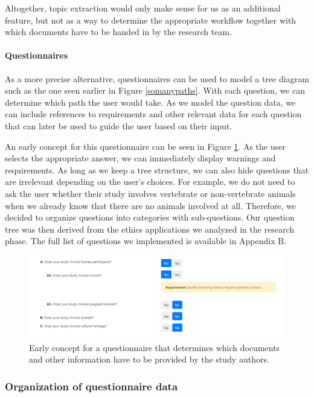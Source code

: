 \documentclass[10pt]{article}
\begin{document}
Altogether, topic extraction would only make sense for us as an additional feature, but not as a way to determine the appropriate workflow together with which documents have to be handed in by the research team.


\paragraph*{Questionnaires}
As a more precise alternative, questionnaires can be used to model a tree diagram such as the one seen earlier in Figure \ref{somanypaths}. With each question, we can determine which path the user would take. As we model the question data, we can include references to requirements and other relevant data for each question that can later be used to guide the user based on their input. 

An early concept for this questionnaire can be seen in Figure \ref{fig:questionnaire1}. As the user selects the appropriate answer, we can immediately display warnings and requirements. As long as we keep a tree structure, we can also hide questions that are irrelevant depending on the user's choices. For example, we do not need to ask the user whether their study involves vertebrate or non-vertebrate animals when we already know that there are no animals involved at all. Therefore, we decided to organize questions into categories with sub-questions. Our question tree was then derived from the ethics applications we analyzed in the research phase. The full list of questions we implemented is available in Appendix B.

\begin{figure}
\includegraphics[width=1\textwidth]{img/questionnaire.jpg}
\caption{Early concept for a questionnaire that determines which documents and other information have to be provided by the study authors.}
\label{fig:questionnaire1}
\end{figure}

\subsubsection{Organization of questionnaire data}
\end{document}
